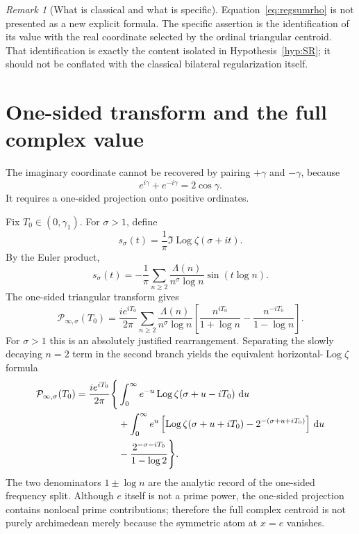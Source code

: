 \documentclass[11pt]{amsart}
\numberwithin{equation}{section}
\theoremstyle{definition}
\theoremstyle{remark}
\newtheorem{remark}[theorem]{Remark}
\newcommand{\dd}{\,\mathrm d}
\newcommand{\Log}{\operatorname{Log}}
\newcommand{\cP}{\mathcal P}
\begin{document}
\begin{remark}[What is classical and what is specific]
Equation~\eqref{eq:regsumrho} is not presented as a new explicit formula.  The specific assertion is the identification of its value with the real coordinate selected by the ordinal triangular centroid.  That identification is exactly the content isolated in Hypothesis~\ref{hyp:SR}; it should not be conflated with the classical bilateral regularization itself.
\end{remark}

\section{One-sided transform and the full complex value}\label{sec:imaginary}

The imaginary coordinate cannot be recovered by pairing $+\gamma$ and $-\gamma$, because
\[
e^{i\gamma}+e^{-i\gamma}=2\cos\gamma.
\]
It requires a one-sided projection onto positive ordinates.

Fix $T_0\in(0,\gamma_1)$.  For $\sigma>1$, define
\[
s_\sigma(t)=\frac1\pi\Im\Log\zeta(\sigma+it).
\]
By the Euler product,
\begin{equation}\label{eq:ssigma}
s_\sigma(t)
=-\frac1\pi\sum_{n\ge2}
\frac{\Lambda(n)}{n^\sigma\log n}\sin(t\log n).
\end{equation}
The one-sided triangular transform gives
\begin{equation}\label{eq:PsigmaPrime}
\cP_{\infty,\sigma}(T_0)
=
\frac{i e^{iT_0}}{2\pi}
\sum_{n\ge2}
\frac{\Lambda(n)}{n^\sigma\log n}
\left[
\frac{n^{iT_0}}{1+\log n}
-
\frac{n^{-iT_0}}{1-\log n}
\right].
\end{equation}
For $\sigma>1$ this is an absolutely justified rearrangement.  Separating the slowly decaying $n=2$ term in the second branch yields the equivalent horizontal-$\Log\zeta$ formula
\begin{align}
\cP_{\infty,\sigma}(T_0)
=\frac{i e^{iT_0}}{2\pi}\Bigg\{&
\int_0^\infty e^{-u}\Log\zeta(\sigma+u-iT_0)\,\dd u\notag\\
&+\int_0^\infty e^u\left[
\Log\zeta(\sigma+u+iT_0)-2^{-(\sigma+u+iT_0)}
\right]\dd u\notag\\
&-\frac{2^{-\sigma-iT_0}}{1-\log2}
\Bigg\}.
\label{eq:PsigmaLogzeta}
\end{align}
The two denominators $1\pm\log n$ are the analytic record of the one-sided frequency split.  Although $e$ itself is not a prime power, the one-sided projection contains nonlocal prime contributions; therefore the full complex centroid is not purely archimedean merely because the symmetric atom at $x=e$ vanishes.
\end{document}
